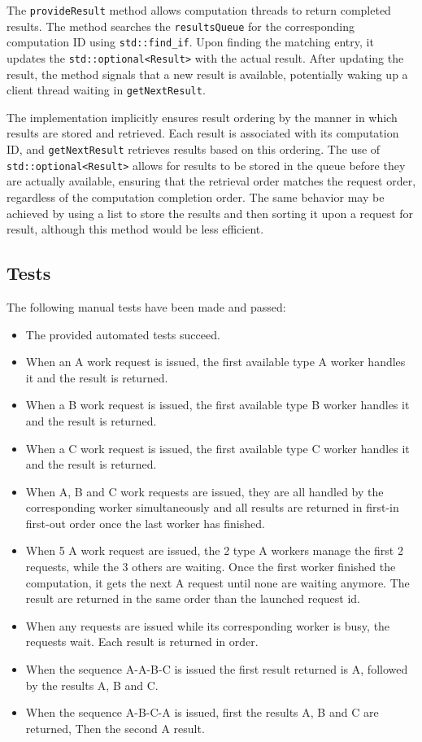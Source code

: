 \documentclass{article}
\begin{document}
    The \texttt{provideResult} method allows computation threads to return completed results.
    The method searches the \texttt{resultsQueue} for the corresponding computation ID using \texttt{std::find\_if}.
    Upon finding the matching entry, it updates the \texttt{std::optional<Result>} with the actual result.
    After updating the result, the method signals that a new result is available, potentially waking up a client thread waiting in \texttt{getNextResult}.

    The implementation implicitly ensures result ordering by the manner in which results are stored and retrieved.
    Each result is associated with its computation ID, and \texttt{getNextResult} retrieves results based on this ordering.
    The use of \texttt{std::optional<Result>} allows for results to be stored in the queue before they are actually available, ensuring that the retrieval order matches the request order, regardless of the computation completion order.
    The same behavior may be achieved by using a list to store the results and then sorting it upon a request for result, although this method would be less efficient.

    \subsection*{Tests}

    The following manual tests have been made and passed:
    \begin{itemize}
        \item The provided automated tests succeed.
        \item When an A work request is issued, the first available type A worker handles it and the result is returned.
        \item When a B work request is issued, the first available type B worker handles it and the result is returned.
        \item When a C work request is issued, the first available type C worker handles it and the result is returned.
        \item When A, B and C work requests are issued, they are all handled by the corresponding worker simultaneously and all results are returned in first-in first-out order once the last worker has finished.
        \item When 5 A work request are issued, the 2 type A workers manage the first 2 requests, while the 3 others are waiting. Once the first worker finished the computation, it gets the next A request until none are waiting anymore. The result are returned in the same order than the launched request id.
        \item When any requests are issued while its corresponding worker is busy, the requests wait. Each result is returned in order.
        \item When the sequence A-A-B-C is issued the first result returned is A, followed by the results A, B and C.
        \item When the sequence A-B-C-A is issued, first the results A, B and C are returned, Then the second A result.
    \end{itemize}
\end{document}
